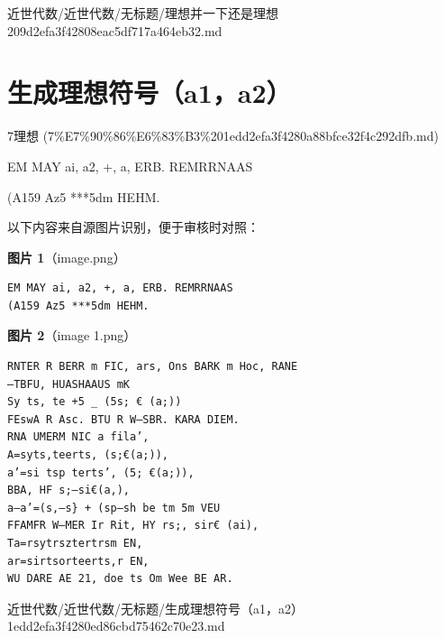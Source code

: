 \begin{note}[来源路径]

近世代数/近世代数/无标题/理想并一下还是理想 209d2efa3f42808eac5df717a464eb32.md

\end{note}

\section*{生成理想符号（a1，a2）}

\begin{note}[来源上级主题]

7理想 (7\%E7\%90\%86\%E6\%83\%B3\%201edd2efa3f4280a88bfce32f4c292dfb.md)

\end{note}

\begin{note}[生成理想符号（a1，a2）]

EM MAY ai, a2, +, a, ERB. REMRRNAAS

(A159 Az5 ***5dm HEHM.

\end{note}

\begin{note}
以下内容来自源图片识别，便于审核时对照：

\textbf{图片 1}（image.png）
\begin{Verbatim}[fontsize=\small]
EM MAY ai, a2, +, a, ERB. REMRRNAAS
(A159 Az5 ***5dm HEHM.
\end{Verbatim}

\textbf{图片 2}（image 1.png）
\begin{Verbatim}[fontsize=\small]
RNTER R BERR m FIC, ars, Ons BARK m Hoc, RANE
—TBFU, HUASHAAUS mK
Sy ts, te +5 _ (5s; € (a;))
FEswA R Asc. BTU R W—SBR. KARA DIEM.
RNA UMERM NIC a fila’,
A=syts,teerts, (s;€(a;)),
a’=si tsp terts’, (5; €(a;)),
BBA, HF s;—si€(a,),
a—a’=(s,—s} + (sp—sh be tm 5m VEU
FFAMFR W—MER Ir Rit, HY rs;, sir€ (ai),
Ta=rsytrsztertrsm EN,
ar=sirtsorteerts,r EN,
WU DARE AE 21, doe ts Om Wee BE AR.
\end{Verbatim}

\end{note}

\begin{note}[来源路径]

近世代数/近世代数/无标题/生成理想符号（a1，a2） 1edd2efa3f4280ed86cbd75462c70e23.md

\end{note}

